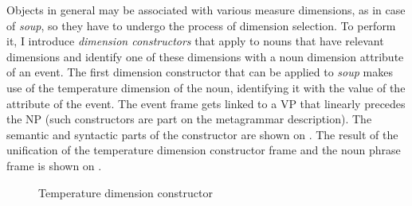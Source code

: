 Objects in general may be associated with various measure dimensions, as in case of \textit{soup}, so they have to undergo the process of dimension selection. To perform it, I introduce \textit{dimension constructors} that apply to nouns that have relevant dimensions and identify one of these dimensions with a noun dimension attribute of an event. The first dimension constructor that can be applied to \textit{soup} makes use of the temperature dimension of the noun, identifying it with the value of the attribute \NOUNDIM of the event. The event frame gets linked to a VP that linearly precedes the NP (such constructors are part on the metagrammar description). The semantic and syntactic parts of the constructor are shown on . The result of the unification of the temperature dimension constructor frame and the noun phrase frame is shown on .

\begin{figure}
\begin{minipage}{0.6\textwidth}
\end{minipage}
\begin{minipage}{0.35\textwidth}
\end{minipage}
\caption{Temperature dimension constructor\label{constructor:temp}}
\end{figure}


